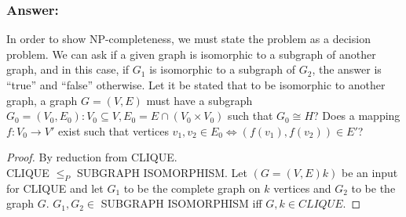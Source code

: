 \documentclass[titlepage]{article}\usepackage[]{graphicx}\usepackage[]{color}
\begin{document}
  \subsubsection{Answer:}
  In order to show NP-completeness, we must state the problem as a decision
  problem. We can ask if a given graph is isomorphic to a subgraph of another
  graph, and in this case, if $G_1$ is isomorphic to a subgraph of $G_2$, the
  answer is ``true'' and ``false'' otherwise. 
  Let it be stated that to be isomorphic to another graph, a graph $G = (V,E)$
  must have a subgraph $G_0 = (V_0, E_0) : V_0 \subseteq V, E_0 =
  E\cap(V_0\times V_0)$ such that $G_0 \cong H$? Does a mapping $f: V_0 \to V'$
  exist such that vertices $v_1, v_2 \in E_0 \Leftrightarrow (f(v_1), f(v_2))
  \in E'$?
  \begin{proof}
    By reduction from CLIQUE. \\
    CLIQUE $\leq_P$ SUBGRAPH ISOMORPHISM. Let $(G = (V,E)k)$ be an input for
    CLIQUE and let $G_1$ to be the complete graph on $k$ vertices and $G_2$ to
    be the graph $G$. $G_1,G_2 \in$ SUBGRAPH ISOMORPHISM iff $G,k \in CLIQUE$.
  \end{proof}
\end{document}
